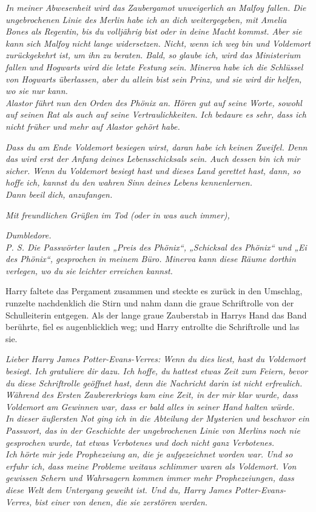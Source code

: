 {\emph{In meiner Abwesenheit wird das Zaubergamot unweigerlich an Malfoy fallen. Die ungebrochenen Linie des Merlin habe ich an dich weitergegeben, mit Amelia Bones als Regentin, bis du volljährig bist oder in deine Macht kommst. Aber sie kann sich Malfoy nicht lange widersetzen. Nicht, wenn ich weg bin und Voldemort zurückgekehrt ist, um ihn zu beraten. Bald, so glaube ich, wird das Ministerium fallen und Hogwarts wird die letzte Festung sein. Minerva habe ich die Schlüssel von Hogwarts überlassen, aber du allein bist sein Prinz, und sie wird dir helfen, wo sie nur kann.}\\ \emph{\hfill\break Alastor führt nun den Orden des Phönix an. Hören gut auf seine Worte, sowohl auf seinen Rat als auch auf seine Vertraulichkeiten. Ich bedaure es sehr, dass ich nicht früher und mehr auf Alastor gehört habe.}

\emph{Dass du am Ende Voldemort besiegen wirst, daran habe ich keinen Zweifel. Denn das wird erst der Anfang deines Lebensschicksals sein. Auch dessen bin ich mir sicher. Wenn du Voldemort besiegt hast und dieses Land gerettet hast, dann, so hoffe ich, kannst du den wahren Sinn deines Lebens kennenlernen.}\\ \emph{\hfill\break Dann beeil dich, anzufangen.}

\emph{Mit freundlichen Grüßen im Tod (oder in was auch immer),}

\emph{Dumbledore.}\\ \emph{\hfill\break P. S. Die Passwörter lauten „Preis des Phönix“, „Schicksal des Phönix“ und „Ei des Phönix“, gesprochen in meinem Büro. Minerva kann diese Räume dorthin verlegen, wo du sie leichter erreichen kannst.}

\hfill\break Harry faltete das Pergament zusammen und steckte es zurück in den Umschlag, runzelte nachdenklich die Stirn und nahm dann die graue Schriftrolle von der Schulleiterin entgegen. Als der lange graue Zauberstab in Harrys Hand das Band berührte, fiel es augenblicklich weg; und Harry entrollte die Schriftrolle und las sie.

\emph{Lieber Harry James Potter-Evans-Verres: Wenn du dies liest, hast du Voldemort besiegt. Ich gratuliere dir dazu. Ich hoffe, du hattest etwas Zeit zum Feiern, bevor du diese Schriftrolle geöffnet hast, denn die Nachricht darin ist nicht erfreulich.}\\ \emph{\hfill\break Während des Ersten Zaubererkriegs kam eine Zeit, in der mir klar wurde, dass Voldemort am Gewinnen war, dass er bald alles in seiner Hand halten würde.\\ In dieser äußersten Not ging ich in die Abteilung der Mysterien und beschwor ein Passwort, das in der Geschichte der ungebrochenen Linie von Merlins noch nie gesprochen wurde, tat etwas Verbotenes und doch nicht ganz Verbotenes.}\\ \emph{\hfill\break Ich hörte mir jede Prophezeiung an, die je aufgezeichnet worden war. Und so erfuhr ich, dass meine Probleme weitaus schlimmer waren als Voldemort. Von gewissen Sehern und Wahrsagern kommen immer mehr Prophezeiungen, dass diese Welt dem Untergang geweiht ist. Und du, Harry James Potter-Evans-Verres, bist einer von denen, die sie zerstören werden.}

}
